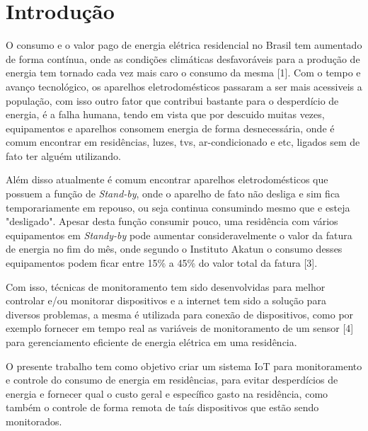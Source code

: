 \chapter{Introdução}\label{CAP:introducao}
O consumo e o valor pago de energia elétrica residencial no Brasil tem aumentado de forma contínua, onde as condições climáticas desfavoráveis para a produção de energia tem tornado cada vez mais caro o consumo da mesma [1]. Com o tempo e avanço tecnológico, os aparelhos eletrodomésticos passaram a ser mais acessiveis a população, com isso outro fator que contribui bastante para o desperdício de energia, é a falha humana, tendo em vista que por descuido muitas vezes, equipamentos e aparelhos consomem energia de forma desnecessária, onde é comum encontrar em residências, luzes, tvs, ar-condicionado e etc, ligados sem de fato ter alguém utilizando.

Além disso atualmente é comum encontrar aparelhos eletrodomésticos que possuem a função de \textit{Stand-by}, onde o aparelho de fato não desliga e sim fica temporariamente em repouso, ou seja continua consumindo mesmo que e esteja "desligado". Apesar desta função consumir pouco, uma residência com vários equipamentos em \textit{Standy-by} pode aumentar consideravelmente o valor da fatura de energia no fim do mês, onde segundo o Instituto Akatun o consumo desses equipamentos podem ficar entre 15\% a 45\% do valor total da fatura [3].

Com isso, técnicas de monitoramento tem sido desenvolvidas para melhor controlar e/ou monitorar dispositivos e a internet tem sido a solução para diversos problemas, a mesma é utilizada para conexão de dispositivos, como por exemplo fornecer em tempo real as variáveis de monitoramento de um sensor [4] para gerenciamento eficiente de energia elétrica em uma residência.

O presente trabalho tem como objetivo criar um sistema IoT para monitoramento e controle do consumo de energia em residências, para evitar desperdícios de energia e fornecer qual o custo geral e específico gasto na residência, como também o controle de forma remota de taís dispositivos que estão sendo monitorados.




 










